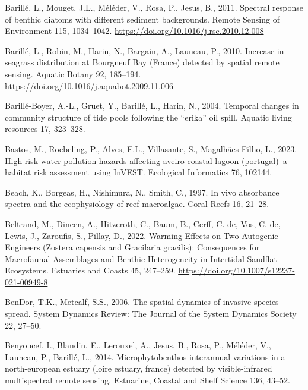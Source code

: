 \documentclass[
  letterpaper,
  11pt,
  english,
  singlespacing,
  headsepline]{MastersDoctoralThesis}
\newlength{\cslhangindent}
\newenvironment{CSLReferences}[2] %
 {\begin{list}{}{%
  \setlength{\itemindent}{0pt}
  \setlength{\leftmargin}{0pt}
  \setlength{\parsep}{0pt}
  \ifodd #1
   \setlength{\leftmargin}{\cslhangindent}
   \setlength{\itemindent}{-1\cslhangindent}
  \fi
  \setlength{\itemsep}{#2\baselineskip}}}
 {\end{list}}
\begin{document}
\begin{CSLReferences}{1}{0}
Barillé, L., Mouget, J.L., Méléder, V., Rosa, P., Jesus, B., 2011.
{Spectral response of benthic diatoms with different sediment
backgrounds}. Remote Sensing of Environment 115, 1034--1042.
\url{https://doi.org/10.1016/j.rse.2010.12.008}

Barillé, L., Robin, M., Harin, N., Bargain, A., Launeau, P., 2010.
{Increase in seagrass distribution at Bourgneuf Bay (France) detected by
spatial remote sensing}. Aquatic Botany 92, 185--194.
\url{https://doi.org/10.1016/j.aquabot.2009.11.006}

Barillé-Boyer, A.-L., Gruet, Y., Barillé, L., Harin, N., 2004. Temporal
changes in community structure of tide pools following the {``erika''}
oil spill. Aquatic living resources 17, 323--328.

Bastos, M., Roebeling, P., Alves, F.L., Villasante, S., Magalhães Filho,
L., 2023. High risk water pollution hazards affecting aveiro coastal
lagoon (portugal)--a habitat risk assessment using InVEST. Ecological
Informatics 76, 102144.

Beach, K., Borgeas, H., Nishimura, N., Smith, C., 1997. In vivo
absorbance spectra and the ecophysiology of reef macroalgae. Coral Reefs
16, 21--28.

Beltrand, M., Dineen, A., Hitzeroth, C., Baum, B., Cerff, C. de, Vos, C.
de, Lewis, J., Zaroufis, S., Pillay, D., 2022. {Warming Effects on Two
Autogenic Engineers (Zostera capensis and Gracilaria gracilis):
Consequences for Macrofaunal Assemblages and Benthic Heterogeneity in
Intertidal Sandflat Ecosystems}. Estuaries and Coasts 45, 247--259.
\url{https://doi.org/10.1007/s12237-021-00949-8}

BenDor, T.K., Metcalf, S.S., 2006. The spatial dynamics of invasive
species spread. System Dynamics Review: The Journal of the System
Dynamics Society 22, 27--50.

Benyoucef, I., Blandin, E., Lerouxel, A., Jesus, B., Rosa, P., Méléder,
V., Launeau, P., Barillé, L., 2014. Microphytobenthos interannual
variations in a north-european estuary (loire estuary, france) detected
by visible-infrared multispectral remote sensing. Estuarine, Coastal and
Shelf Science 136, 43--52.


\end{CSLReferences}
\end{document}
